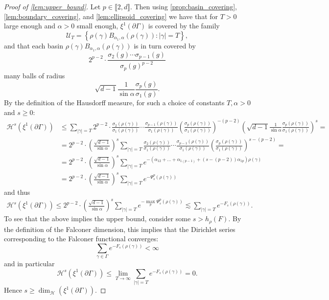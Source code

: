 \documentclass{report}
\begin{document}
\begin{proof}[Proof of \cref{lem:upper_bound}]
Let $p \in \llbracket 2, d \rrbracket$.
Then using \cref{prop:basin_covering}, \cref{lem:boundary_covering}, and \cref{lem:ellipsoid_covering} we have that for $T>0$ large enough and $\alpha > 0$ small enough, $\xi^1(\partial \Gamma)$ is covered by the family
\[
    \mathcal U_T = \left\{ \rho(\gamma) B_{\alpha_1, \alpha}(\rho(\gamma)) : |\gamma| = T \right\},
\]
and that each basin $\rho(\gamma) B_{\alpha_1, \alpha}(\rho(\gamma))$ is in turn covered by
\[
    2^{p-2} \cdot \frac{\sigma_2(g) \cdots \sigma_{p-1}(g)}{\sigma_p(g)^{p-2}}
\]
many balls of radius
\[
    \sqrt{d-1} \frac{1}{\sin \alpha} \frac{\sigma_p(g)}{\sigma_1(g)}.
\]
By the definition of the Hausdorff measure, for such a choice of constants $T, \alpha > 0$ and $s \geq 0$:
\begin{align*}
    \mathcal H^s(\xi^1(\partial \Gamma)) &\leq
    \sum_{|\gamma| = T}
        2^{p-2} \cdot 
        \frac{\sigma_2(\rho(\gamma))}{\sigma_1(\rho(\gamma))} \cdots 
            \frac{\sigma_{p-1}(\rho(\gamma))}{\sigma_1(\rho(\gamma))}
        \left(
            \frac{\sigma_p(\rho(\gamma))}{\sigma_1(\rho(\gamma))}
        \right)^{-(p-2)}
        \left(
            \sqrt{d-1} \frac{1}{\sin \alpha} \frac{\sigma_p(\rho(\gamma))}{\sigma_1(\rho(\gamma))}
        \right)^s =\\
        &=
        2^{p-2} \cdot \left( \frac{\sqrt{d-1}}{\sin \alpha}\right)^s  
        \sum_{|\gamma| = T} 
        \frac{\sigma_2(\rho(\gamma))}{\sigma_1(\rho(\gamma))} \cdots 
            \frac{\sigma_{p-1}(\rho(\gamma))}{\sigma_1(\rho(\gamma))}
        \left(
            \frac{\sigma_p(\rho(\gamma))}{\sigma_1(\rho(\gamma))}
        \right)^{s-(p-2)} =\\
        &=
        2^{p-2} \cdot \left( \frac{\sqrt{d-1}}{\sin \alpha}\right)^s  
        \sum_{|\gamma| = T}
        e^{-\left( \alpha_{1 2} + \ldots + \alpha_{1 (p-1)} + (s - (p-2))\alpha_{1 p} \right)\rho(\gamma)}\\
        &=
        2^{p-2} \cdot \left( \frac{\sqrt{d-1}}{\sin \alpha}\right)^s  
        \sum_{|\gamma| = T}
        e^{-\Psi_s^p(\rho(\gamma))}
\end{align*}
and thus
\begin{align*}
    \mathcal H^s(\xi^1(\partial \Gamma)) \leq
    2^{p-2} \cdot \left( \frac{\sqrt{d-1}}{\sin \alpha}\right)^s
    \sum_{|\gamma| = T}
    e^{-\max_p \Psi_s^p(\rho(\gamma)) }\lesssim \sum_{|\gamma| = T} e^{-F_s(\rho(\gamma))}.
\end{align*}
To see that the above implies the upper bound, consider some $s > h_\rho(F)$.
By the definition of the Falconer dimension, this implies that the Dirichlet series corresponding to the Falconer functional converges:
\[
    \sum_{\gamma \in \Gamma} e^{-F_s(\rho(\gamma))} < \infty
\]
and in particular
\[
    \mathcal H^s(\xi^1(\partial \Gamma)) \leq 
    \lim_{T \to \infty} \sum_{|\gamma| = T} e^{-F_s(\rho(\gamma))} = 0.
\]
Hence $s \geq \dim_{\mathcal H}(\xi^1(\partial \Gamma))$.
\end{proof}
\end{document}
